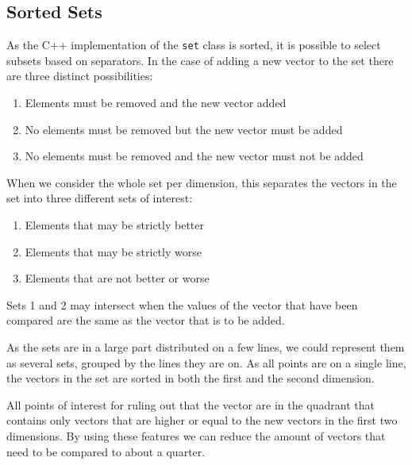 \documentclass{article}
\begin{document}
	\subsection{Sorted Sets}
	\label{sub:sorted_sets}
	As the C++ implementation of the \texttt{set} class is sorted, it is
	possible to select subsets based on separators. In the case of adding a new
	vector to the set there are three distinct possibilities:
	\begin{enumerate}
		\item Elements must be removed and the new vector added
		\item No elements must be removed but the new vector must be added
		\item No elements must be removed and the new vector must not be added
	\end{enumerate}
	When we consider the whole set per dimension, this separates the vectors in
	the set into three different sets of interest:
	\begin{enumerate}
		\item Elements that may be strictly better
		\item Elements that may be strictly worse
		\item Elements that are not better or worse
	\end{enumerate}
	Sets 1 and 2 may intersect when the values of the vector that have been
	compared are the same as the vector that is to be added.

	As the sets are in a large part distributed on a few lines, we could
	represent them as several sets, grouped by the lines they are on. As all
	points are on a single line, the vectors in the set are sorted in both the
	first and the second dimension.

	All points of interest for ruling out that the vector are in the quadrant
	that contains only vectors that are higher or equal to the new vectors in
	the first two dimensions. By using these features we can reduce the amount
	of vectors that need to be compared to about a quarter.
\end{document}
